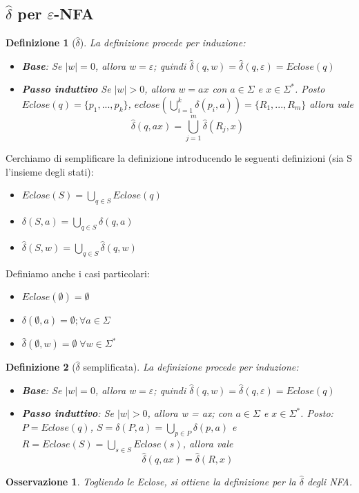 \documentclass[12pt]{article}
\newtheorem{Definizione}{Definizione}[subsection]
\newtheorem{Osservazione}{Osservazione}[subsection]
\begin{document}
\subsection{$\hat{\delta}$ per $\varepsilon$-NFA}
\begin{Definizione}[$\hat{\delta}$]
La definizione procede per induzione:
\begin{itemize}
    \item \textbf{Base}: Se $|w| = 0$, allora $w = \varepsilon$; quindi $\hat{\delta}(q, w) = \hat{\delta}(q, \varepsilon) = Eclose(q)$
    \item \textbf{Passo induttivo} Se $|w| > 0$, allora $w = ax$ con $a \in \Sigma$ e $x \in \Sigma^*$. Posto $Eclose(q) = \{p_1, ..., p_k\}$, $eclose(\bigcup_{i=1}^k \delta(p_i, a)) = \{R_1, ..., R_m\}$ allora vale $$\hat{\delta}(q, ax) = \bigcup_{j = 1}^m \hat{\delta}(R_j, x)$$
\end{itemize}
\end{Definizione}
Cerchiamo di semplificare la definizione introducendo le seguenti definizioni (sia S l'insieme degli stati):
\begin{itemize}
    \item $Eclose(S) = \bigcup_{q \in S}Eclose(q)$
    \item $\delta(S, a) = \bigcup_{q \in S} \delta(q, a)$
    \item $\hat{\delta}(S, w) = \bigcup_{q \in S} \hat{\delta}(q, w)$
\end{itemize}
Definiamo anche i casi particolari:
\begin{itemize}
    \item $Eclose(\emptyset) = \emptyset$
    \item $\delta(\emptyset, a) = \emptyset ; \forall a \in \Sigma$
    \item $\hat{\delta}(\emptyset, w) = \emptyset \; \forall w \in \Sigma^*$
\end{itemize}
\begin{Definizione}[$\hat{\delta}$ semplificata]
La definizione procede per induzione:
\begin{itemize}
    \item \textbf{Base}: Se $|w| = 0$, allora $w = \varepsilon$; quindi $\hat{\delta}(q, w) = \hat{\delta}(q, \varepsilon) = Eclose(q)$
    \item \textbf{Passo induttivo}: Se $|w| > 0$, allora w = ax; con $a \in \Sigma$ e $x \in \Sigma^*$. Posto: $P = Eclose(q)$, $S = \delta(P, a) = \bigcup_{p \in P} \delta(p, a)$ e $R = Eclose(S) = \bigcup_{s \in S}Eclose(s)$, allora vale $$\hat{\delta}(q, ax) = \hat{\delta}(R, x)$$
\end{itemize}
\end{Definizione}
\begin{Osservazione}
    Togliendo le Eclose, si ottiene la definizione per la $\hat{\delta}$ degli NFA.
\end{Osservazione}
\newpage
\end{document}
